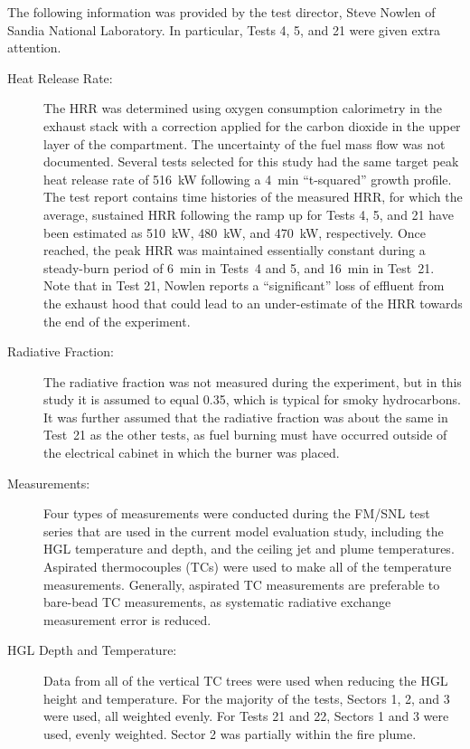 The following information was provided by the test director, Steve Nowlen of Sandia National Laboratory. In particular, Tests 4, 5, and 21 were given extra attention.
\begin{description}
\item[Heat Release Rate:] The HRR was determined using oxygen consumption calorimetry in the exhaust stack with a correction applied for the carbon dioxide in the upper layer of the compartment. The uncertainty of the fuel mass flow was not documented. Several tests selected for this study had the same target peak heat release rate of 516~kW following a 4~min ``t-squared'' growth profile. The test report contains time histories of the measured HRR, for which the average, sustained HRR following the ramp up for Tests 4, 5, and 21 have been estimated as 510~kW, 480~kW, and 470~kW, respectively. Once reached, the peak HRR was maintained essentially constant during a steady-burn period of 6~min in Tests~4 and 5, and 16~min in Test~21. Note that in Test 21, Nowlen reports a ``significant'' loss of effluent from the exhaust hood that could lead to an under-estimate of the HRR towards the end of the experiment.
\item[Radiative Fraction:] The radiative fraction was not measured during the experiment, but in this study it is assumed to equal 0.35, which is typical for smoky hydrocarbons. It was further assumed that the radiative fraction was about the same in Test~21 as the other tests, as fuel burning must have occurred outside of the electrical cabinet in which the burner was placed.
\item[Measurements:] Four types of measurements were conducted during the FM/SNL test series that are used in the current model evaluation study, including the HGL temperature and depth, and the ceiling jet and plume temperatures. Aspirated thermocouples (TCs) were used to make all of the temperature measurements. Generally, aspirated TC measurements are preferable to bare-bead TC measurements, as systematic radiative exchange measurement error is reduced.
\item[HGL Depth and Temperature:] Data from all of the vertical TC trees were used when reducing the HGL height and temperature. For the majority of the tests, Sectors 1, 2, and 3 were used, all weighted evenly. For Tests 21 and 22, Sectors 1 and 3 were used, evenly weighted. Sector 2 was partially within the fire plume.
\end{description}



